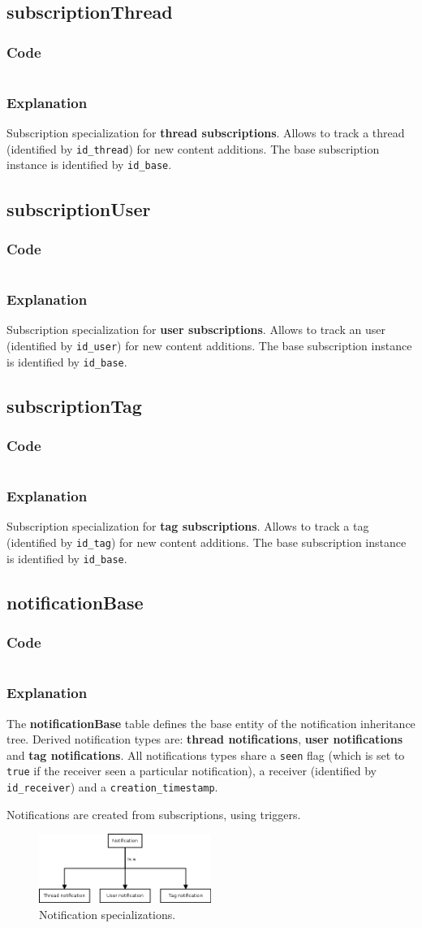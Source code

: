 \documentclass[12pt]{report}
\renewcommand\emph{\textbf}
\newcommand{\printSQLtest}[1]
{
    \inputminted[linenos, breaklines, breakbytoken, tabsize=4, fontsize=\footnotesize]{mysql}{#1}
}
\newcommand{\printSQLTablepage}[2]
{    
    \subsection{#2}
    \subsubsection{Code}
    \printSQLtest{../sql/parts/#1}
    \subsubsection{Explanation}
}
\begin{document}
                \newpage

                \printSQLTablepage{12_tblSubscriptionThread.sql}{subscriptionThread}
                    Subscription specialization for \emph{thread subscriptions}. Allows to track a thread (identified by \texttt{id_thread}) for new content additions.
                    The base subscription instance is identified by \texttt{id_base}.

                \newpage

                \printSQLTablepage{13_tblSubscriptionUser.sql}{subscriptionUser}
                    Subscription specialization for \emph{user subscriptions}. Allows to track an user (identified by \texttt{id_user}) for new content additions.
                    The base subscription instance is identified by \texttt{id_base}.

                \newpage

                \printSQLTablepage{14_tblSubscriptionTag.sql}{subscriptionTag}
                    Subscription specialization for \emph{tag subscriptions}. Allows to track a tag (identified by \texttt{id_tag}) for new content additions.
                    The base subscription instance is identified by \texttt{id_base}.

                \newpage

                \printSQLTablepage{15_tblNotificationBase.sql}{notificationBase}
                    The \emph{notificationBase} table defines the base entity of the notification inheritance tree. Derived notification types are: \emph{thread notifications}, \emph{user notifications} and \emph{tag notifications}.
                    All notifications types share a \texttt{seen} flag (which is set to \texttt{true} if the receiver seen a particular notification), a receiver (identified by \texttt{id_receiver}) and a \texttt{creation_timestamp}.

                    Notifications are created from subscriptions, using triggers.

                    \begin{figure}[!htb]
                    \caption{Notification specializations.}
                    \centering
                    \includegraphics[width=0.5\textwidth]{td/15notificationbase}
                    \end{figure}
\end{document}
